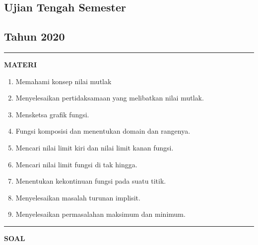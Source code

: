 \newpage
\begin{flushright}
    \section*{\Large{Ujian Tengah Semester}}
    \subsection*{Tahun 2020}
\end{flushright}
\vspace{0.5cm}
\hrule height 2pt
\vspace{0.5cm}
\begin{center}
    \textbf{\large{MATERI}}
    \begin{enumerate}[leftmargin=*, label={\arabic*}.]
        \item Memahami konsep nilai mutlak
        \item Menyelesaikan pertidaksamaan yang melibatkan nilai mutlak.
        \item Mensketsa grafik fungsi.
        \item Fungsi komposisi dan menentukan domain dan rangenya.
        \item Mencari nilai limit kiri dan nilai limit kanan fungsi.
        \item Mencari nilai limit fungsi di tak hingga.
        \item Menentukan kekontinuan fungsi pada suatu titik.
        \item Menyelesaikan masalah turunan implisit.
        \item Menyelesaikan permasalahan maksimum dan minimum.
    \end{enumerate}
\end{center}
\vspace{0.2cm}
\hrule height 1pt
\vspace{0.5cm}
\begin{center}
    \textbf{\large{SOAL}}
\end{center}

